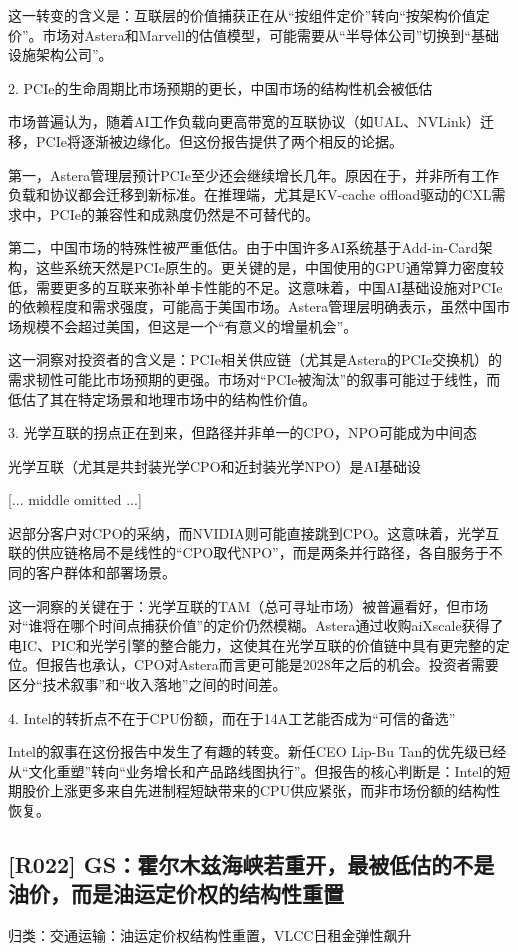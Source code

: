 \documentclass[11pt]{ctexart}
\begin{document}
这一转变的含义是：互联层的价值捕获正在从“按组件定价”转向“按架构价值定价”。市场对Astera和Marvell的估值模型，可能需要从“半导体公司”切换到“基础设施架构公司”。

2. PCIe的生命周期比市场预期的更长，中国市场的结构性机会被低估

市场普遍认为，随着AI工作负载向更高带宽的互联协议（如UAL、NVLink）迁移，PCIe将逐渐被边缘化。但这份报告提供了两个相反的论据。

第一，Astera管理层预计PCIe至少还会继续增长几年。原因在于，并非所有工作负载和协议都会迁移到新标准。在推理端，尤其是KV-cache offload驱动的CXL需求中，PCIe的兼容性和成熟度仍然是不可替代的。

第二，中国市场的特殊性被严重低估。由于中国许多AI系统基于Add-in-Card架构，这些系统天然是PCIe原生的。更关键的是，中国使用的GPU通常算力密度较低，需要更多的互联来弥补单卡性能的不足。这意味着，中国AI基础设施对PCIe的依赖程度和需求强度，可能高于美国市场。Astera管理层明确表示，虽然中国市场规模不会超过美国，但这是一个“有意义的增量机会”。

这一洞察对投资者的含义是：PCIe相关供应链（尤其是Astera的PCIe交换机）的需求韧性可能比市场预期的更强。市场对“PCIe被淘汰”的叙事可能过于线性，而低估了其在特定场景和地理市场中的结构性价值。

3. 光学互联的拐点正在到来，但路径并非单一的CPO，NPO可能成为中间态

光学互联（尤其是共封装光学CPO和近封装光学NPO）是AI基础设

[... middle omitted ...]

迟部分客户对CPO的采纳，而NVIDIA则可能直接跳到CPO。这意味着，光学互联的供应链格局不是线性的“CPO取代NPO”，而是两条并行路径，各自服务于不同的客户群体和部署场景。

这一洞察的关键在于：光学互联的TAM（总可寻址市场）被普遍看好，但市场对“谁将在哪个时间点捕获价值”的定价仍然模糊。Astera通过收购aiXscale获得了电IC、PIC和光学引擎的整合能力，这使其在光学互联的价值链中具有更完整的定位。但报告也承认，CPO对Astera而言更可能是2028年之后的机会。投资者需要区分“技术叙事”和“收入落地”之间的时间差。

4. Intel的转折点不在于CPU份额，而在于14A工艺能否成为“可信的备选”

Intel的叙事在这份报告中发生了有趣的转变。新任CEO Lip-Bu Tan的优先级已经从“文化重塑”转向“业务增长和产品路线图执行”。但报告的核心判断是：Intel的短期股价上涨更多来自先进制程短缺带来的CPU供应紧张，而非市场份额的结构性恢复。

\subsection{[R022] GS：霍尔木兹海峡若重开，最被低估的不是油价，而是油运定价权的结构性重置}
{\small\color{refgray}归类：交通运输：油运定价权结构性重置，VLCC日租金弹性飙升}
\end{document}

